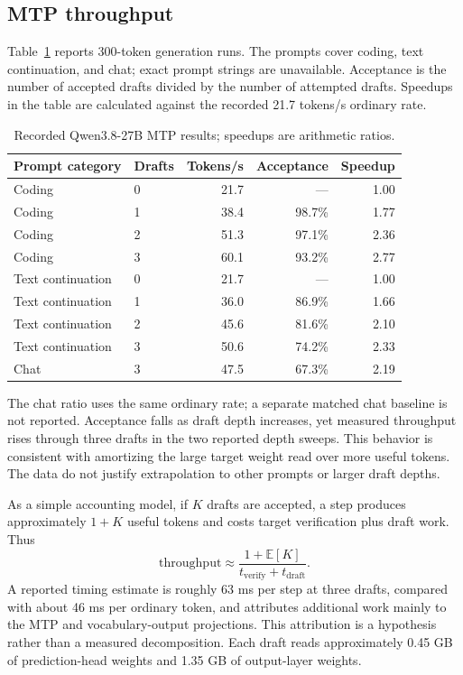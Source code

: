 \documentclass[10pt]{article}
\begin{document}
\subsection{MTP throughput}
Table~\ref{tab:mtp} reports 300-token generation runs. The prompts cover coding, text continuation, and chat; exact prompt strings are unavailable. Acceptance is the number of accepted drafts divided by the number of attempted drafts. Speedups in the table are calculated against the recorded 21.7 tokens/s ordinary rate.
\begin{table}[ht]
\centering
\caption{Recorded Qwen3.8-27B MTP results; speedups are arithmetic ratios.}
\label{tab:mtp}
\begin{tabular}{llrrr}
\toprule
Prompt category & Drafts & Tokens/s & Acceptance & Speedup\\
\midrule
Coding & 0 & 21.7 & --- & 1.00\\
Coding & 1 & 38.4 & 98.7\% & 1.77\\
Coding & 2 & 51.3 & 97.1\% & 2.36\\
Coding & 3 & 60.1 & 93.2\% & 2.77\\
Text continuation & 0 & 21.7 & --- & 1.00\\
Text continuation & 1 & 36.0 & 86.9\% & 1.66\\
Text continuation & 2 & 45.6 & 81.6\% & 2.10\\
Text continuation & 3 & 50.6 & 74.2\% & 2.33\\
Chat & 3 & 47.5 & 67.3\% & 2.19\\
\bottomrule
\end{tabular}
\end{table}
The chat ratio uses the same ordinary rate; a separate matched chat baseline is not reported. Acceptance falls as draft depth increases, yet measured throughput rises through three drafts in the two reported depth sweeps. This behavior is consistent with amortizing the large target weight read over more useful tokens. The data do not justify extrapolation to other prompts or larger draft depths.

As a simple accounting model, if $K$ drafts are accepted, a step produces approximately $1+K$ useful tokens and costs target verification plus draft work. Thus
\begin{equation}
 \mathrm{throughput}\approx\frac{1+\mathbb E[K]}{t_{\mathrm{verify}}+t_{\mathrm{draft}}}.
\end{equation}
A reported timing estimate is roughly 63 ms per step at three drafts, compared with about 46 ms per ordinary token, and attributes additional work mainly to the MTP and vocabulary-output projections. This attribution is a hypothesis rather than a measured decomposition. Each draft reads approximately 0.45 GB of prediction-head weights and 1.35 GB of output-layer weights.
\end{document}

